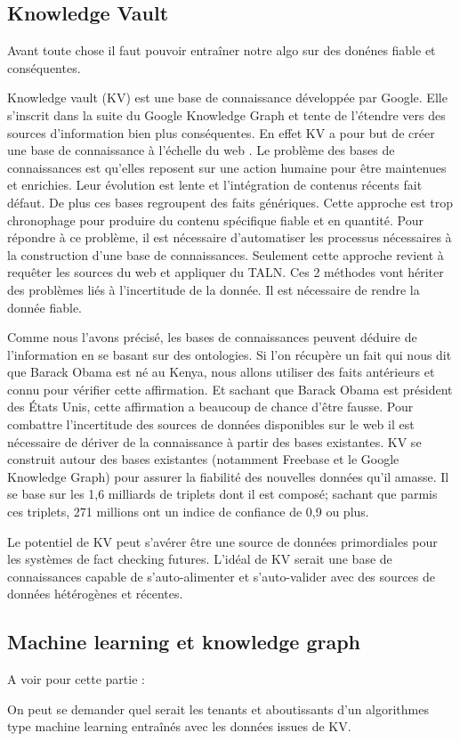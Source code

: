 \subsection{Knowledge Vault}

Avant toute chose il faut pouvoir entraîner notre algo sur des donénes fiable et conséquentes.

Knowledge vault (KV) est une base de connaissance développée par Google. Elle s'inscrit dans la suite du Google Knowledge Graph et tente de l'étendre vers des sources d'information bien plus conséquentes. En effet KV a pour but de créer une base de connaissance à l'échelle du web \cite{dong2014knowledge}. Le problème des bases de connaissances est qu'elles reposent sur une action humaine pour être maintenues et enrichies. Leur évolution est lente et l'intégration de contenus récents fait défaut. De plus ces bases regroupent des faits génériques. Cette approche est trop chronophage pour produire du contenu spécifique fiable et en quantité. Pour répondre à ce problème, il est nécessaire d'automatiser les processus nécessaires à la construction d'une base de connaissances. Seulement cette approche revient à requêter les sources du web et appliquer du TALN. Ces 2 méthodes vont hériter des problèmes liés à l'incertitude de la donnée. Il est nécessaire de rendre la donnée fiable.

Comme nous l'avons précisé, les bases de connaissances peuvent déduire de l'information en se basant sur des ontologies. Si l'on récupère un fait qui nous dit que Barack Obama est né au Kenya, nous allons utiliser des faits antérieurs et connu pour vérifier cette affirmation. Et sachant que Barack Obama est président des États Unis, cette affirmation a beaucoup de chance d'être fausse. Pour combattre l'incertitude des sources de données disponibles sur le web il est nécessaire de dériver de la connaissance à partir des bases existantes. KV se construit autour des bases existantes (notamment Freebase et le Google Knowledge Graph) pour assurer la fiabilité des nouvelles données qu'il amasse. Il se base sur les 1,6 milliards de triplets dont il est composé; sachant que parmis ces triplets, 271 millions ont un indice de confiance de 0,9 ou plus.

Le potentiel de KV peut s'avérer être une source de données primordiales pour les systèmes de fact checking futures. L'idéal de KV serait une base de connaissances capable de s'auto-alimenter et s'auto-valider avec des sources de données hétérogènes et récentes.


\subsection{Machine learning et knowledge graph}

A voir pour cette partie : \cite{nickel2016review} \cite{gerber2015}  \cite{wilcke2017knowledge}

On peut se demander quel serait les tenants et aboutissants d'un algorithmes type machine learning entraînés avec les données issues de KV.